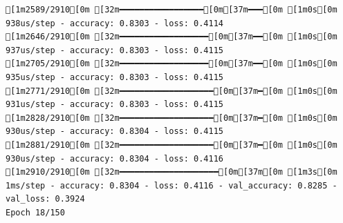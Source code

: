 \documentclass[
  letterpaper,
  DIV=11,
  numbers=noendperiod]{scrartcl}
\begin{document}
\begin{verbatim}
[1m2589/2910[0m [32m━━━━━━━━━━━━━━━━━[0m[37m━━━[0m [1m0s[0m 938us/step - accuracy: 0.8303 - loss: 0.4114
[1m2646/2910[0m [32m━━━━━━━━━━━━━━━━━━[0m[37m━━[0m [1m0s[0m 937us/step - accuracy: 0.8303 - loss: 0.4115
[1m2705/2910[0m [32m━━━━━━━━━━━━━━━━━━[0m[37m━━[0m [1m0s[0m 935us/step - accuracy: 0.8303 - loss: 0.4115
[1m2771/2910[0m [32m━━━━━━━━━━━━━━━━━━━[0m[37m━[0m [1m0s[0m 931us/step - accuracy: 0.8303 - loss: 0.4115
[1m2828/2910[0m [32m━━━━━━━━━━━━━━━━━━━[0m[37m━[0m [1m0s[0m 930us/step - accuracy: 0.8304 - loss: 0.4115
[1m2881/2910[0m [32m━━━━━━━━━━━━━━━━━━━[0m[37m━[0m [1m0s[0m 930us/step - accuracy: 0.8304 - loss: 0.4116
[1m2910/2910[0m [32m━━━━━━━━━━━━━━━━━━━━[0m[37m[0m [1m3s[0m 1ms/step - accuracy: 0.8304 - loss: 0.4116 - val_accuracy: 0.8285 - val_loss: 0.3924
Epoch 18/150


\end{verbatim}
\end{document}
